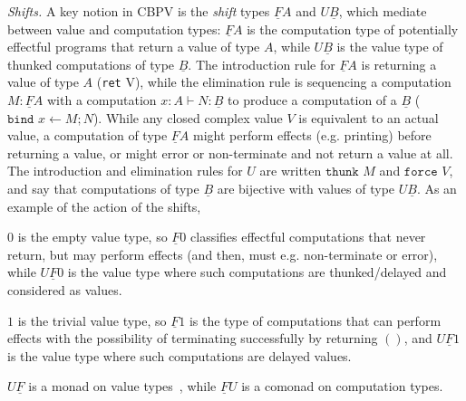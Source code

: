 \documentclass[acmsmall,nonacm]{acmart}
\renewcommand{\u}{\underline}
\newcommand{\bindXtoYinZ}[2]{\kw{bind}#2 \leftarrow #1;}
\newcommand{\kw}[1]{\texttt{#1}\,\,}
\newcommand{\ret}{\kw{ret}}
\newcommand{\thunk}{\kw{thunk}}
\newcommand{\force}{\kw{force}}
\begin{document}
\emph{Shifts.}
A key notion in CBPV is the \emph{shift} types $\u F A$ and $U \u B$,
which mediate between value and computation types: $\u F A$ is the
computation type of potentially effectful programs that return a value
of type $A$, while $U \u B$ is the value type of thunked computations of
type $\u B$.  The introduction rule for $\u F A$ is returning a value of
type $A$ (\ret{V}), while the elimination rule is sequencing a
computation $M : \u F A$ with a computation $x : A \vdash N : \u B$ to
produce a computation of a $\u B$ ($\bindXtoYinZ{M}{x}{N}$).  While any
closed complex value $V$ is equivalent to an actual value, a computation
of type $\u F A$ might perform effects (e.g. printing) before returning
a value, or might error or non-terminate and not return a value at all.
The introduction and elimination rules for $U$ are written $\thunk{M}$
and $\force{V}$, and say that computations of type $\u B$ are bijective
with values of type $U \u B$.  As an example of the action of the
shifts,
\begin{longonly}
  $0$ is the empty value type, so $\u F 0$ classifies effectful
computations that never return, but may perform effects (and then, must
e.g. non-terminate or error), while $U \u F 0$ is the value type where
such computations are thunked/delayed and considered as values.
\end{longonly}
$1$ is the trivial value type, so $\u F 1$ is the type of computations
that can perform effects with the possibility of terminating
  successfully by returning $()$, and $U \u F 1$ is the value type where
  such computations are delayed values.
\begin{longonly}  
  $U \u F$ is a monad on value
  types~\citep{moggi91}, while $\u F U$ is a comonad on computation types.
\end{longonly}
\end{document}
